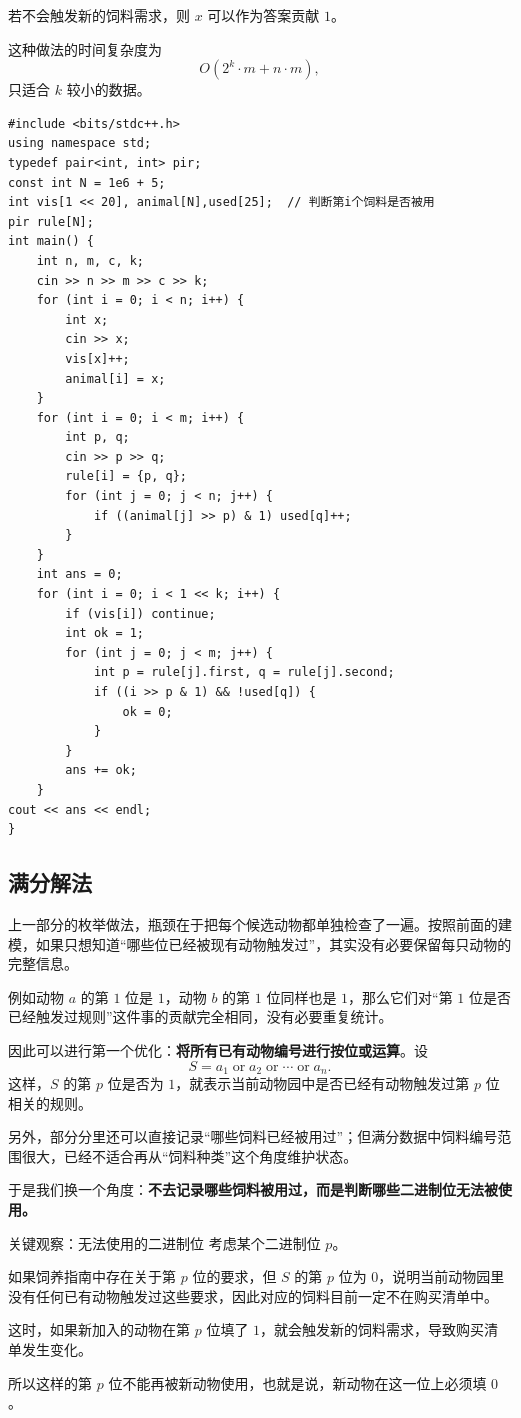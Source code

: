 \documentclass{book}
\begin{document}
若不会触发新的饲料需求，则 $x$ 可以作为答案贡献 $1$。

这种做法的时间复杂度为
\[
O(2^k\cdot m+n\cdot m),
\]
只适合 $k$ 较小的数据。

\begin{lstlisting}[style = code]
#include <bits/stdc++.h>
using namespace std;
typedef pair<int, int> pir;
const int N = 1e6 + 5;
int vis[1 << 20], animal[N],used[25];  // 判断第i个饲料是否被用
pir rule[N];
int main() {
    int n, m, c, k;
    cin >> n >> m >> c >> k;
    for (int i = 0; i < n; i++) {
        int x;
        cin >> x;
        vis[x]++;
        animal[i] = x;
    }
    for (int i = 0; i < m; i++) {
        int p, q;
        cin >> p >> q;
        rule[i] = {p, q};
        for (int j = 0; j < n; j++) {
            if ((animal[j] >> p) & 1) used[q]++;
        }
    }
    int ans = 0;
    for (int i = 0; i < 1 << k; i++) {
        if (vis[i]) continue;
        int ok = 1;
        for (int j = 0; j < m; j++) {
            int p = rule[j].first, q = rule[j].second;
            if ((i >> p & 1) && !used[q]) {
                ok = 0;
            }
        }
        ans += ok;
    }
cout << ans << endl;
}\end{lstlisting}   
\newpage
\subsection{满分解法}
上一部分的枚举做法，瓶颈在于把每个候选动物都单独检查了一遍。按照前面的建模，如果只想知道“哪些位已经被现有动物触发过”，其实没有必要保留每只动物的完整信息。

例如动物 $a$ 的第 $1$ 位是 $1$，动物 $b$ 的第 $1$ 位同样也是 $1$，那么它们对“第 $1$ 位是否已经触发过规则”这件事的贡献完全相同，没有必要重复统计。

因此可以进行第一个优化：\textbf{将所有已有动物编号进行按位或运算}。设
\[
S=a_1\operatorname{or}a_2\operatorname{or}\cdots\operatorname{or}a_n.
\]
这样，$S$ 的第 $p$ 位是否为 $1$，就表示当前动物园中是否已经有动物触发过第 $p$ 位相关的规则。

另外，部分分里还可以直接记录“哪些饲料已经被用过”；但满分数据中饲料编号范围很大，已经不适合再从“饲料种类”这个角度维护状态。

于是我们换一个角度：\textbf{不去记录哪些饲料被用过，而是判断哪些二进制位无法被使用。}

\begin{keybox}{关键观察：无法使用的二进制位}
考虑某个二进制位 $p$。

如果饲养指南中存在关于第 $p$ 位的要求，但 $S$ 的第 $p$ 位为 $0$，说明当前动物园里没有任何已有动物触发过这些要求，因此对应的饲料目前一定不在购买清单中。

这时，如果新加入的动物在第 $p$ 位填了 $1$，就会触发新的饲料需求，导致购买清单发生变化。

所以这样的第 $p$ 位不能再被新动物使用，也就是说，新动物在这一位上必须填 $0$。
\end{keybox}
\end{document}
